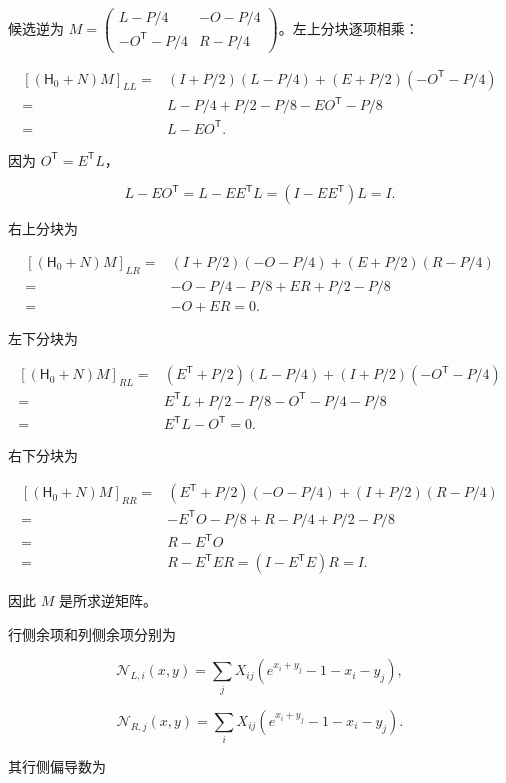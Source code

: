 \documentclass[11pt,a4paper]{article}
\begin{document}
候选逆为 \(M=\left(\begin{smallmatrix}L-P/4&-O-P/4\\-O^{\mathsf T}-P/4&R-P/4\end{smallmatrix}\right)\)。左上分块逐项相乘：

\[
\begin{aligned}
[(\mathsf H_0+N)M]_{LL}
={}&(I+P/2)(L-P/4)+(E+P/2)(-O^{\mathsf T}-P/4)\\
={}&L-P/4+P/2-P/8-EO^{\mathsf T}-P/8\\
={}&L-EO^{\mathsf T}.
\end{aligned}
\]

因为 \(O^{\mathsf T}=E^{\mathsf T}L\)，

\[
L-EO^{\mathsf T}=L-EE^{\mathsf T}L=(I-EE^{\mathsf T})L=I.
\]

右上分块为

\[
\begin{aligned}
[(\mathsf H_0+N)M]_{LR}
={}&(I+P/2)(-O-P/4)+(E+P/2)(R-P/4)\\
={}&-O-P/4-P/8+ER+P/2-P/8\\
={}&-O+ER=0.
\end{aligned}
\]

左下分块为

\[
\begin{aligned}
[(\mathsf H_0+N)M]_{RL}
={}&(E^{\mathsf T}+P/2)(L-P/4)+(I+P/2)(-O^{\mathsf T}-P/4)\\
={}&E^{\mathsf T}L+P/2-P/8-O^{\mathsf T}-P/4-P/8\\
={}&E^{\mathsf T}L-O^{\mathsf T}=0.
\end{aligned}
\]

右下分块为

\[
\begin{aligned}
[(\mathsf H_0+N)M]_{RR}
={}&(E^{\mathsf T}+P/2)(-O-P/4)+(I+P/2)(R-P/4)\\
={}&-E^{\mathsf T}O-P/8+R-P/4+P/2-P/8\\
={}&R-E^{\mathsf T}O\\
={}&R-E^{\mathsf T}ER=(I-E^{\mathsf T}E)R=I.
\end{aligned}
\]

因此 \(M\) 是所求逆矩阵。

行侧余项和列侧余项分别为

\[
\mathcal N_{L,i}(x,y)=\sum_jX_{ij}(e^{x_i+y_j}-1-x_i-y_j),
\]

\[
\mathcal N_{R,j}(x,y)=\sum_iX_{ij}(e^{x_i+y_j}-1-x_i-y_j).
\]

其行侧偏导数为
\end{document}
